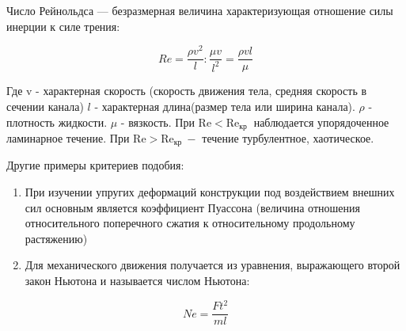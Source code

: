 Число Рейнольдса --- безразмерная величина характеризующая отношение силы инерции к силе трения:

$$
R e=\frac{\rho v^{2}}{l}: \frac{\mu v}{l^{2}}=\frac{\rho v l}{\mu}
$$

Где v - характерная скорость (скорость движения тела, средняя скорость в сечении канала) $l$ - характерная длина(размер тела или ширина канала). $\rho$ - плотность жидкости. $\mu$ - вязкость. При $\mathrm{Re}<\mathrm{Re}_{\text {кр }}$ наблюдается упорядоченное ламинарное течение. При $\mathrm{Re}>\mathrm{Re}_{\text {кр }}-$ течение турбулентное, хаотическое.

Другие примеры критериев подобия:

\begin{enumerate}
  \item При изучении упругих деформаций конструкции под воздействием внешних сил основным является  коэффициент Пуассона (величина отношения относительного поперечного сжатия к относительному продольному растяжению)

  \item Для механического движения получается из уравнения, выражающего второй закон Ньютона и называется числом Ньютона:

\end{enumerate}

$$
N e=\frac{F t^{2}}{m l}
$$
